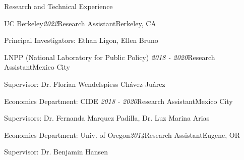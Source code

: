 \documentclass{resume} %
\begin{document}
\begin{rSection}{Research and Technical Experience}

\begin{rSubsection}{UC Berkeley}{\textit{2022}}{Research Assistant}{Berkeley, CA}
    \item Principal Investigators: Ethan Ligon, Ellen Bruno
\end{rSubsection}

\begin{rSubsection}{LNPP (National Laboratory for Public Policy)}{\textit{ 2018 - 2020}}{Research Assistant}{Mexico City}
\item Supervisor: Dr. Florian Wendelspiess Chávez Juárez
\end{rSubsection}


\begin{rSubsection}{Economics Department: CIDE}{\textit{ 2018 -  2020}}{Research Assistant}{Mexico City}
\item Supervisors: Dr. Fernanda Marquez Padilla, Dr. Luz Marina Arias 
\end{rSubsection}

\begin{rSubsection}{Economics Department: Univ. of Oregon}{\textit{2014}}{Research Assistant}{Eugene, OR}
\item Supervisor: Dr. Benjamin Hansen
\end{rSubsection}
\end{rSection}
\end{document}
